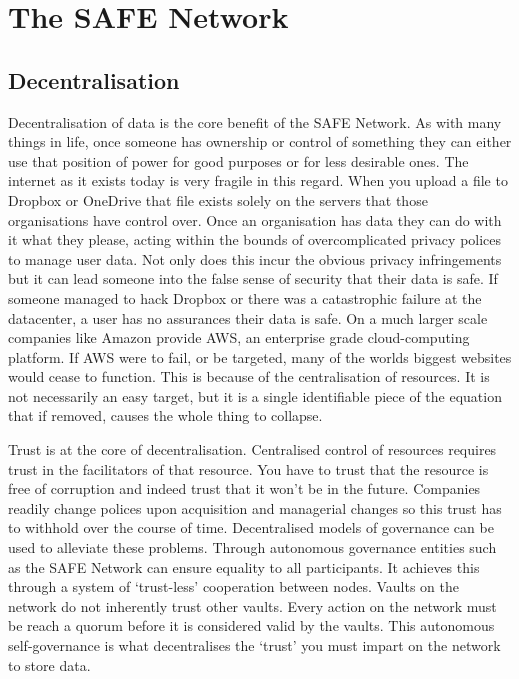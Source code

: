\chapter{The SAFE Network}
\label{ch:thesafenetwork}

\section{Decentralisation}

Decentralisation of data is the core benefit of the SAFE Network. As with many things in life, once someone has ownership or control of something they can either use that position of power for good purposes or for less desirable ones. The internet as it exists today is very fragile in this regard. When you upload a file to Dropbox\cite{dropbox} or OneDrive\cite{onedrive} that file exists solely on the servers that those organisations have control over. Once an organisation has data they can do with it what they please, acting within the bounds of overcomplicated privacy polices to manage user data. Not only does this incur the obvious privacy infringements but it can lead someone into the false sense of security that their data is safe. If someone managed to hack Dropbox or there was a catastrophic failure at the datacenter, a user has no assurances their data is safe. On a much larger scale companies like Amazon provide AWS\cite{amazon-aws}, an enterprise grade cloud-computing platform. If AWS were to fail, or be targeted, many of the worlds biggest websites would cease to function. This is because of the centralisation of resources. It is not necessarily an easy target, but it is a single identifiable piece of the equation that if removed, causes the whole thing to collapse.

Trust is at the core of decentralisation. Centralised control of resources requires trust in the facilitators of that resource. You have to trust that the resource is free of corruption and indeed trust that it won't be in the future. Companies readily change polices upon acquisition and managerial changes so this trust has to withhold over the course of time. Decentralised models of governance can be used to alleviate these problems. Through autonomous governance entities such as the SAFE Network can ensure equality to all participants. It achieves this through a system of `trust-less' cooperation between nodes. Vaults on the network do not inherently trust other vaults. Every action on the network must be reach a quorum before it is considered valid by the vaults. This autonomous self-governance is what decentralises the `trust' you must impart on the network to store data.

